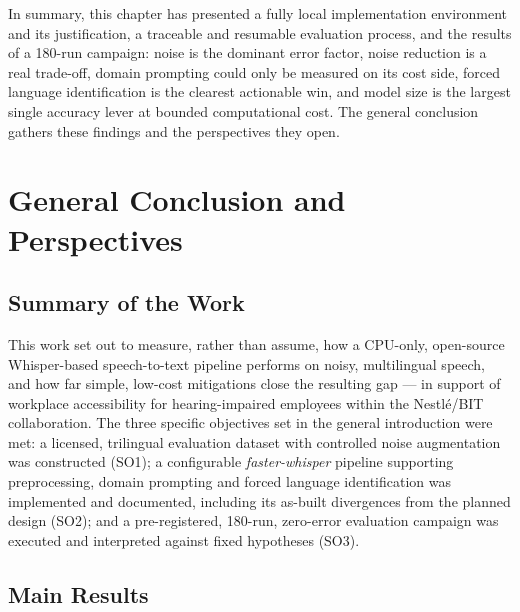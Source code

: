 \documentclass[12pt]{report}
\begin{document}
\vspace{0.5em}
In summary, this chapter has presented a fully local implementation environment and its justification, a traceable and resumable evaluation process, and the results of a 180-run campaign: noise is the dominant error factor, noise reduction is a real trade-off, domain prompting could only be measured on its cost side, forced language identification is the clearest actionable win, and model size is the largest single accuracy lever at bounded computational cost. The general conclusion gathers these findings and the perspectives they open.

\chapter*{General Conclusion and Perspectives}
\thispagestyle{fancy}

\section*{Summary of the Work}

This work set out to measure, rather than assume, how a CPU-only, open-source Whisper-based speech-to-text pipeline performs on noisy, multilingual speech, and how far simple, low-cost mitigations close the resulting gap --- in support of workplace accessibility for hearing-impaired employees within the Nestl\'e/BIT collaboration. The three specific objectives set in the general introduction were met: a licensed, trilingual evaluation dataset with controlled noise augmentation was constructed (SO1); a configurable \textit{faster-whisper} pipeline supporting preprocessing, domain prompting and forced language identification was implemented and documented, including its as-built divergences from the planned design (SO2); and a pre-registered, 180-run, zero-error evaluation campaign was executed and interpreted against fixed hypotheses (SO3).

\section*{Main Results}
\end{document}
